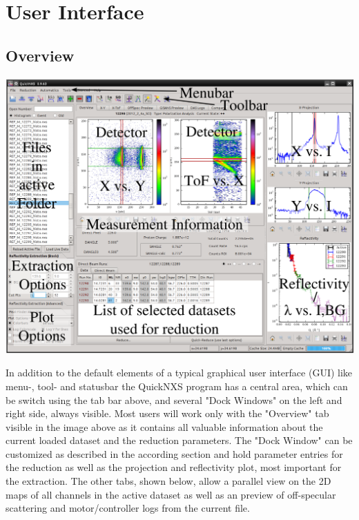 \chapter{User Interface}
\label{chap:user_interface}

\section{Overview}
\def\svgwidth{\textwidth}
\begin{LARGE}
\includegraphics[width=455pt]{screenshots/overview_labels.png} 
\end{LARGE}

In addition to the default elements of a typical graphical user interface (GUI) like menu-, tool- and statusbar the QuickNXS program has a central area, which can be switch using the tab bar above, and several "Dock Windows" on the left and right side, always visible. Most users will work only with the "Overview" tab visible in the image above as it contains all valuable information about the current loaded dataset and the reduction parameters. 
The "Dock Window" can be customized as described in the according section and hold parameter entries for the reduction as well as the projection and reflectivity plot, most important for the extraction.
The other tabs, shown below, allow a parallel view on the 2D maps of all channels in the active dataset as well as an preview of off-specular scattering and motor/controller logs from the current file.

